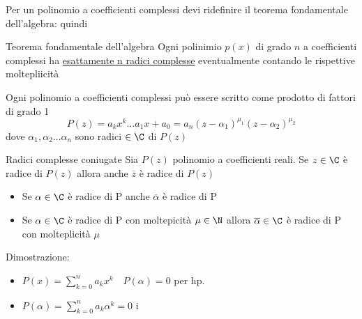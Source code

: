 Per un polinomio a coefficienti complessi devi ridefinire il teorema fondamentale dell'algebra:
quindi
\begin{teorema}{Teorema fondamentale dell'algebra}
	Ogni polinimio $ p\left( x \right) $ di grado $n$ a coefficienti complessi ha  \underline{esattamente n radici complesse} eventualmente contando le rispettive moltepliicità
\end{teorema}
Ogni polinomio a coefficienti complessi può essere scritto come prodotto di fattori di grado 1
\[
	P\left( z \right) = a_k x ^{k}\ldots a_1 x + a_0 = a_n \left( z-\alpha_1 \right)^{\mu_1} \left( z-\alpha_2 \right) ^{\mu_2}
\]
dove $\alpha_1, \alpha_2 \ldots \alpha_n$ sono radici $  \in  \C$ di $ P\left( z \right) $

\begin{teorema}{Radici complesse coniugate}
	Sia $ P\left( z \right) $ polinomio a coefficienti reali. Se $ z  \in  \C$ è radice di $ P\left( z \right) $ allora anche $\overline{z}$ è radice di $ P\left( z \right) $
\end{teorema}
\begin{itemize}
	\item Se $ \alpha  \in  \C$ è radice di P anche $\overline{\alpha}$ è radice di P
	\item Se $\alpha  \in  \C$ è radice di P con moltepicità $\mu  \in  \N$ allora $ \overline{\alpha}  \in  \C$ è radice di P con molteplicità $\mu$
\end{itemize}

Dimostrazione:
\begin{itemize}
	\item $P\left( x \right)  = \sum_{k=0}^{n} a_k x^k \quad P\left( \alpha \right) = 0$ per hp.
	\item $P\left( \alpha \right)  = \sum_{k=0}^{n} a_k \alpha^k = 0$
	      i
\end{itemize}

